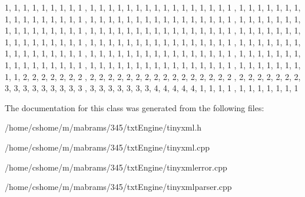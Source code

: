 \begin{DoxyCode}
 
{
        
                1,      1,      1,      1,      1,      1,      1,      1,      1
      ,       1,      1,      1,      1,      1,      1,      1,      
                1,      1,      1,      1,      1,      1,      1,      1,      1
      ,       1,      1,      1,      1,      1,      1,      1,      
                1,      1,      1,      1,      1,      1,      1,      1,      1
      ,       1,      1,      1,      1,      1,      1,      1,      
                1,      1,      1,      1,      1,      1,      1,      1,      1
      ,       1,      1,      1,      1,      1,      1,      1,      
                1,      1,      1,      1,      1,      1,      1,      1,      1
      ,       1,      1,      1,      1,      1,      1,      1,      
                1,      1,      1,      1,      1,      1,      1,      1,      1
      ,       1,      1,      1,      1,      1,      1,      1,      
                1,      1,      1,      1,      1,      1,      1,      1,      1
      ,       1,      1,      1,      1,      1,      1,      1,      
                1,      1,      1,      1,      1,      1,      1,      1,      1
      ,       1,      1,      1,      1,      1,      1,      1,      
                1,      1,      1,      1,      1,      1,      1,      1,      1
      ,       1,      1,      1,      1,      1,      1,      1,      
                1,      1,      1,      1,      1,      1,      1,      1,      1
      ,       1,      1,      1,      1,      1,      1,      1,      
                1,      1,      1,      1,      1,      1,      1,      1,      1
      ,       1,      1,      1,      1,      1,      1,      1,      
                1,      1,      1,      1,      1,      1,      1,      1,      1
      ,       1,      1,      1,      1,      1,      1,      1,      
                1,      1,      2,      2,      2,      2,      2,      2,      2
      ,       2,      2,      2,      2,      2,      2,      2,      
                2,      2,      2,      2,      2,      2,      2,      2,      2
      ,       2,      2,      2,      2,      2,      2,      2,      
                3,      3,      3,      3,      3,      3,      3,      3,      3
      ,       3,      3,      3,      3,      3,      3,      3,      
                4,      4,      4,      4,      4,      1,      1,      1,      1
      ,       1,      1,      1,      1,      1,      1,      1       
}
\end{DoxyCode}


The documentation for this class was generated from the following files:\begin{DoxyCompactItemize}
\item 
/home/cshome/m/mabrams/345/txtEngine/tinyxml.h\item 
/home/cshome/m/mabrams/345/txtEngine/tinyxml.cpp\item 
/home/cshome/m/mabrams/345/txtEngine/tinyxmlerror.cpp\item 
/home/cshome/m/mabrams/345/txtEngine/tinyxmlparser.cpp\end{DoxyCompactItemize}
